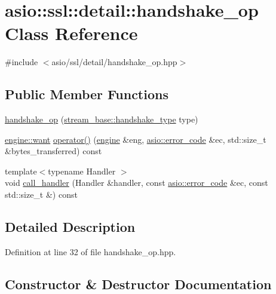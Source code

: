 \hypertarget{classasio_1_1ssl_1_1detail_1_1handshake__op}{}\section{asio\+:\+:ssl\+:\+:detail\+:\+:handshake\+\_\+op Class Reference}
\label{classasio_1_1ssl_1_1detail_1_1handshake__op}


{\ttfamily \#include $<$asio/ssl/detail/handshake\+\_\+op.\+hpp$>$}

\subsection*{Public Member Functions}
\begin{DoxyCompactItemize}
\item 
\hyperlink{classasio_1_1ssl_1_1detail_1_1handshake__op_a800c0bb3764e5422affa8d402de86adc}{handshake\+\_\+op} (\hyperlink{classasio_1_1ssl_1_1stream__base_a2f18813d3860bc8aee99249834d7c320}{stream\+\_\+base\+::handshake\+\_\+type} type)
\item 
\hyperlink{classasio_1_1ssl_1_1detail_1_1engine_ab9812153941a6a93c9095f4e5ca8f915}{engine\+::want} \hyperlink{classasio_1_1ssl_1_1detail_1_1handshake__op_a9113bc416170702197ff6a1b703b6fc7}{operator()} (\hyperlink{classasio_1_1ssl_1_1detail_1_1engine}{engine} \&eng, \hyperlink{classasio_1_1error__code}{asio\+::error\+\_\+code} \&ec, std\+::size\+\_\+t \&bytes\+\_\+transferred) const 
\item 
{\footnotesize template$<$typename Handler $>$ }\\void \hyperlink{classasio_1_1ssl_1_1detail_1_1handshake__op_a6b91526ae72ee6f69eff7942851e790e}{call\+\_\+handler} (Handler \&handler, const \hyperlink{classasio_1_1error__code}{asio\+::error\+\_\+code} \&ec, const std\+::size\+\_\+t \&) const 
\end{DoxyCompactItemize}


\subsection{Detailed Description}


Definition at line 32 of file handshake\+\_\+op.\+hpp.



\subsection{Constructor \& Destructor Documentation}
\hypertarget{classasio_1_1ssl_1_1detail_1_1handshake__op_a800c0bb3764e5422affa8d402de86adc}{}
